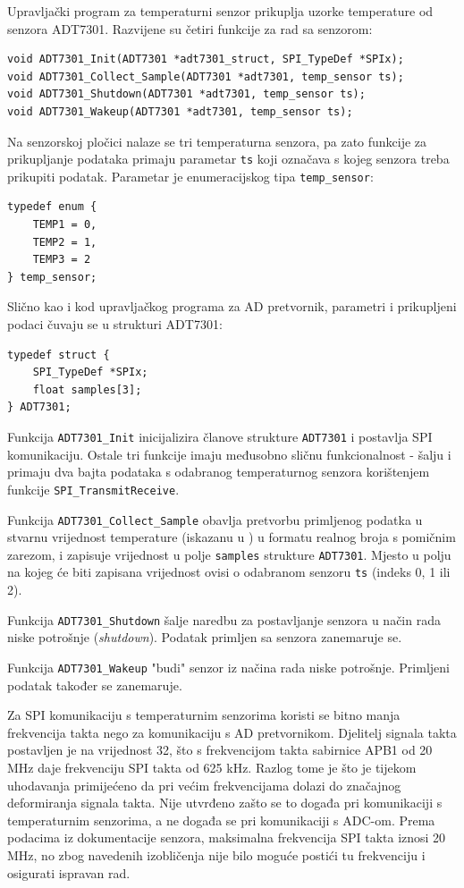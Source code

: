 Upravljački program za temperaturni senzor prikuplja uzorke temperature od senzora ADT7301. Razvijene su četiri funkcije za rad sa senzorom:

\begin{lstlisting}
void ADT7301_Init(ADT7301 *adt7301_struct, SPI_TypeDef *SPIx);
void ADT7301_Collect_Sample(ADT7301 *adt7301, temp_sensor ts);
void ADT7301_Shutdown(ADT7301 *adt7301, temp_sensor ts);
void ADT7301_Wakeup(ADT7301 *adt7301, temp_sensor ts);
\end{lstlisting}

Na senzorskoj pločici nalaze se tri temperaturna senzora, pa zato funkcije za prikupljanje podataka primaju parametar \texttt{ts} koji označava s kojeg senzora treba prikupiti podatak. Parametar je enumeracijskog tipa \texttt{temp\_sensor}:

\begin{lstlisting}
typedef enum {
    TEMP1 = 0,
    TEMP2 = 1,
    TEMP3 = 2
} temp_sensor;
\end{lstlisting}

Slično kao i kod upravljačkog programa za AD pretvornik, parametri i prikupljeni podaci čuvaju se u strukturi ADT7301:

\begin{lstlisting}
typedef struct {
	SPI_TypeDef *SPIx;
	float samples[3];
} ADT7301;
\end{lstlisting}

Funkcija \texttt{ADT7301\_Init} inicijalizira članove strukture \texttt{ADT7301} i postavlja SPI komunikaciju. Ostale tri funkcije imaju međusobno sličnu funkcionalnost - šalju i primaju dva bajta podataka s odabranog temperaturnog senzora korištenjem funkcije \texttt{SPI\_TransmitReceive}. 

Funkcija \texttt{ADT7301\_Collect\_Sample} obavlja pretvorbu primljenog podatka u stvarnu vrijednost temperature (iskazanu u \textcelsius{}) u formatu realnog broja s pomičnim zarezom, i zapisuje vrijednost u polje \texttt{samples} strukture \texttt{ADT7301}. Mjesto u polju na kojeg će biti zapisana vrijednost ovisi o odabranom senzoru \texttt{ts} (indeks 0, 1 ili 2).

Funkcija \texttt{ADT7301\_Shutdown} šalje naredbu za postavljanje senzora u način rada niske potrošnje (\textit{shutdown}). Podatak primljen sa senzora zanemaruje se.

Funkcija \texttt{ADT7301\_Wakeup} "budi" senzor iz načina rada niske potrošnje. Primljeni podatak također se zanemaruje.

Za SPI komunikaciju s temperaturnim senzorima koristi se bitno manja frekvencija takta nego za komunikaciju s AD pretvornikom. Djelitelj signala takta postavljen je na vrijednost 32, što s frekvencijom takta sabirnice APB1 od 20 MHz daje frekvenciju SPI takta od 625 kHz. Razlog tome je što je tijekom uhodavanja primijećeno da pri većim frekvencijama dolazi do značajnog deformiranja signala takta. Nije utvrđeno zašto se to događa pri komunikaciji s temperaturnim senzorima, a ne događa se pri komunikaciji s ADC-om. Prema podacima iz dokumentacije senzora, maksimalna frekvencija SPI takta iznosi 20 MHz, no zbog navedenih izobličenja nije bilo moguće postići tu frekvenciju i osigurati ispravan rad.


